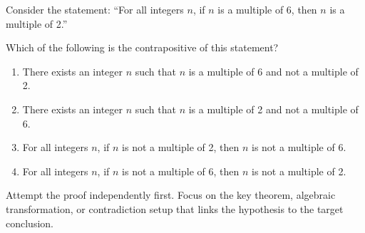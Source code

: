 
\begin{problem}
Consider the statement: ``For all integers $n$, if $n$ is a multiple of 6, then $n$ is a multiple of 2.''

Which of the following is the contrapositive of this statement?

\begin{enumerate}[label=\Alph*.]
    \item There exists an integer $n$ such that $n$ is a multiple of 6 and not a multiple of 2.
    \item There exists an integer $n$ such that $n$ is a multiple of 2 and not a multiple of 6.
    \item For all integers $n$, if $n$ is not a multiple of 2, then $n$ is not a multiple of 6.
    \item For all integers $n$, if $n$ is not a multiple of 6, then $n$ is not a multiple of 2.
\end{enumerate}
\end{problem}

\begin{hint}
Attempt the proof independently first. Focus on the key theorem, algebraic transformation, or contradiction setup that links the hypothesis to the target conclusion.
\end{hint}

